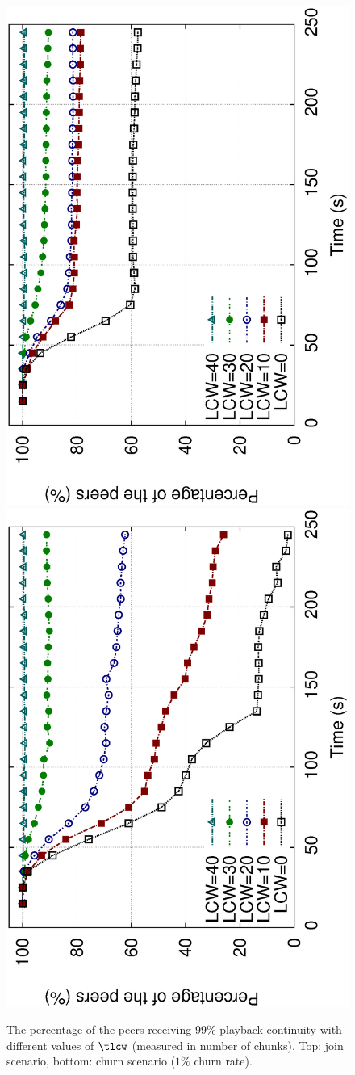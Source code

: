 \begin{figure}[t]
\centering
\includegraphics[angle=270, width=0.47\columnwidth,]{fig-pc-join}\label{fig:pc-join}
\vspace{-2pt}
\includegraphics[angle=270, width=0.47\columnwidth]{fig-pc-churn}\label{fig:pc-churn}
\caption{\small The percentage of the peers receiving 99\% playback continuity with different values of $\tlcw$ (measured in number of chunks). Top: join scenario, bottom: churn scenario ($1\%$ churn rate).}
\label{fig:pc}
\end{figure}

